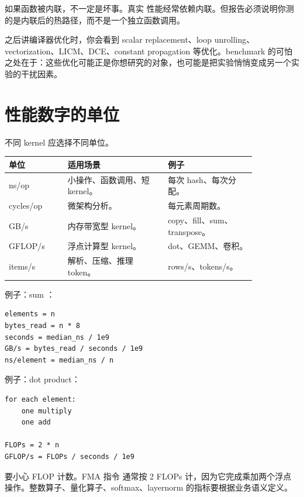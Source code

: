 如果函数被内联，不一定是坏事。真实  性能经常依赖内联。但报告必须说明你测的是内联后的热路径，而不是一个独立函数调用。

\begin{deepdive}
之后讲编译器优化时，你会看到 scalar replacement、loop unrolling、vectorization、LICM、DCE、constant propagation 等优化。benchmark 的可怕之处在于：这些优化可能正是你想研究的对象，也可能是把实验悄悄变成另一个实验的干扰因素。
\end{deepdive}

\section{性能数字的单位}

不同 kernel 应选择不同单位。

\begin{center}
\begin{tabular}{p{0.20\linewidth}p{0.34\linewidth}p{0.30\linewidth}}
\toprule
单位 & 适用场景 & 例子 \\
\midrule
ns/op & 小操作、函数调用、短 kernel。 & 每次 hash、每次分配。 \\
cycles/op & 微架构分析。 & 每元素周期数。 \\
GB/s & 内存带宽型 kernel。 & copy、fill、sum、transpose。 \\
GFLOP/s & 浮点计算型 kernel。 & dot、GEMM、卷积。 \\
items/s & 解析、压缩、推理 token。 & rows/s、tokens/s。 \\
\bottomrule
\end{tabular}
\end{center}

例子：sum ：

\begin{lstlisting}
elements = n
bytes_read = n * 8
seconds = median_ns / 1e9
GB/s = bytes_read / seconds / 1e9
ns/element = median_ns / n
\end{lstlisting}

例子：dot product：

\begin{lstlisting}
for each element:
    one multiply
    one add

FLOPs = 2 * n
GFLOP/s = FLOPs / seconds / 1e9
\end{lstlisting}

要小心 FLOP 计数。FMA 指令  通常按 2 FLOPs 计，因为它完成乘加两个浮点操作。整数算子、量化算子、softmax、layernorm 的指标要根据业务语义定义。

